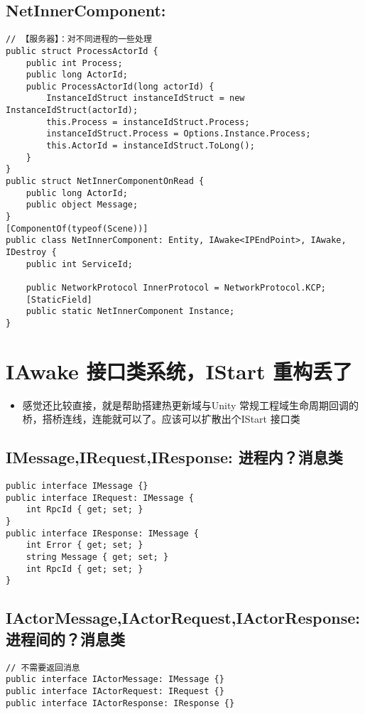\documentclass[9pt, b5paper]{article}
\begin{document}
\subsection{NetInnerComponent:}
\label{sec-1-9}
\begin{verbatim}
// 【服务器】：对不同进程的一些处理
public struct ProcessActorId {
    public int Process;
    public long ActorId;
    public ProcessActorId(long actorId) {
        InstanceIdStruct instanceIdStruct = new InstanceIdStruct(actorId);
        this.Process = instanceIdStruct.Process;
        instanceIdStruct.Process = Options.Instance.Process;
        this.ActorId = instanceIdStruct.ToLong();
    }
}
public struct NetInnerComponentOnRead {
    public long ActorId;
    public object Message;
}
[ComponentOf(typeof(Scene))]
public class NetInnerComponent: Entity, IAwake<IPEndPoint>, IAwake, IDestroy {
    public int ServiceId;

    public NetworkProtocol InnerProtocol = NetworkProtocol.KCP;
    [StaticField]
    public static NetInnerComponent Instance;
}
\end{verbatim}

\section{IAwake 接口类系统，IStart 重构丢了}
\label{sec-2}
\begin{itemize}
\item 感觉还比较直接，就是帮助搭建热更新域与Unity 常规工程域生命周期回调的桥，搭桥连线，连能就可以了。应该可以扩散出个IStart 接口类
\end{itemize}
\subsection{IMessage,IRequest,IResponse: 进程内？消息类}
\label{sec-2-1}
\begin{verbatim}
public interface IMessage {}
public interface IRequest: IMessage {
    int RpcId { get; set; }
}
public interface IResponse: IMessage {
    int Error { get; set; }
    string Message { get; set; }
    int RpcId { get; set; }
}
\end{verbatim}
\subsection{IActorMessage,IActorRequest,IActorResponse: 进程间的？消息类}
\label{sec-2-2}
\begin{verbatim}
// 不需要返回消息
public interface IActorMessage: IMessage {}
public interface IActorRequest: IRequest {}
public interface IActorResponse: IResponse {}
\end{verbatim}
\end{document}
